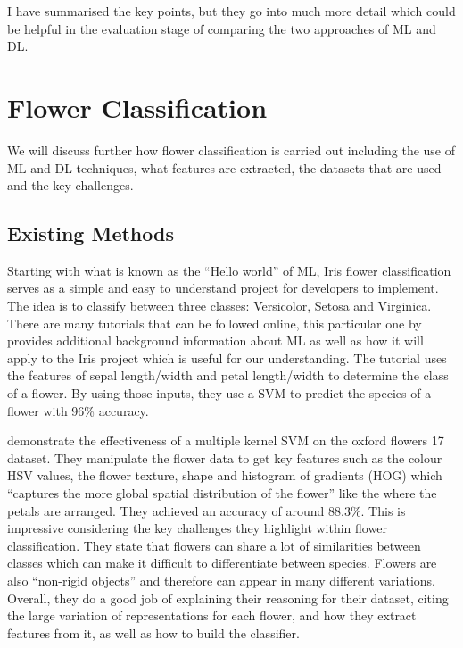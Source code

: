 \documentclass[12pt,a4paper]{report}
\begin{document}
I have summarised the key points, but they go into much more detail which could be helpful in the evaluation stage 
of comparing the two approaches of ML and DL.

\section{Flower Classification}

We will discuss further how flower classification is carried out including the use of ML and DL techniques, what 
features are extracted, the datasets that are used and the key challenges.

\subsection{Existing Methods}

Starting with what is known as the “Hello world” of ML, Iris flower classification serves as a simple and easy to 
understand project for developers to implement. The idea is to classify between three classes: Versicolor, Setosa and 
Virginica. There are many tutorials that can be followed online, this particular one by \citet{DataFlairND}
provides additional background information about ML as well as how it will apply to the Iris project which is useful for
our understanding. The tutorial uses the features of sepal length/width and petal length/width to determine the class of
a flower. By using those inputs, they use a SVM to predict the species of a flower with 96\% accuracy.

\par

\citet{Nilsback2008} demonstrate the effectiveness of a multiple kernel SVM on the oxford flowers 17 dataset. 
They manipulate the flower data to get key features such as the colour HSV values, the flower texture, shape and 
histogram of gradients (HOG) which “captures the more global spatial distribution of the flower” like the where the 
petals are arranged. They achieved an accuracy of around 88.3\%. This is impressive considering the key challenges they 
highlight within flower classification. They state that flowers can share a lot of similarities between classes which 
can make it difficult to differentiate between species. Flowers are also “non-rigid objects” and therefore can appear in
many different variations. Overall, they do a good job of explaining their reasoning for their dataset, citing the 
large variation of representations for each flower, and how they extract features from it, as well as how to build the
classifier.
\end{document}
